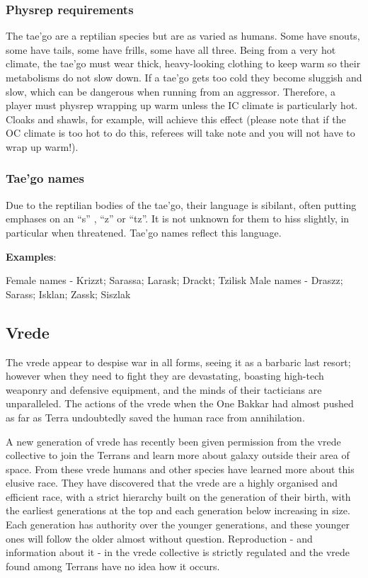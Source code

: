 \subsubsection{Physrep requirements}

The tae'go are a reptilian species but are as varied as humans. Some have snouts, some have tails, some have frills, some have all three. Being from a very hot climate, the tae'go must wear thick, heavy-looking clothing to keep warm so their metabolisms do not slow down. If a tae'go gets too cold they become sluggish and slow, which can be dangerous when running from an aggressor. Therefore, a player must physrep wrapping up warm unless the IC climate is particularly hot. Cloaks and shawls, for example, will achieve this effect (please note that if the OC climate is too hot to do this, referees will take note and you will not have to wrap up warm!).

\subsubsection{Tae'go names}

Due to the reptilian bodies of the tae'go, their language is sibilant, often putting emphases on an ``s'' , ``z'' or ``tz''. It is not unknown for them to hiss slightly, in particular when threatened. Tae'go names reflect this language.

\textbf{Examples}:

Female names - Krizzt; Sarassa; Larask; Drackt; Tzilisk Male names - Draszz; Sarass; Isklan; Zassk; Siszlak

\subsection{Vrede}

The vrede appear to despise war in all forms, seeing it as a barbaric last resort; however when they need to fight they are devastating, boasting high-tech weaponry and defensive equipment, and the minds of their tacticians are unparalleled. The actions of the vrede when the One Bakkar had almost pushed as far as Terra undoubtedly saved the human race from annihilation.

A new generation of vrede has recently been given permission from the vrede collective to join the Terrans and learn more about galaxy outside their area of space. From these vrede humans and other species have learned more about this elusive race. They have discovered that the vrede are a highly organised and efficient race, with a strict hierarchy built on the generation of their birth, with the earliest generations at the top and each generation below increasing in size. Each generation has authority over the younger generations, and these younger ones will follow the older almost without question. Reproduction - and information about it - in the vrede collective is strictly regulated and the vrede found among Terrans have no idea how it occurs.

